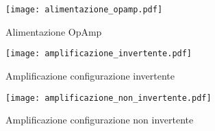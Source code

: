 \begin{figure}[width=0.7\textwidth]
 \centering 
 \texttt{[image: alimentazione\_opamp.pdf]} 
 \caption{Alimentazione OpAmp} 
\end{figure}

\begin{figure}[width=0.7\textwidth]
 \centering 
 \texttt{[image: amplificazione\_invertente.pdf]} 
 \caption{Amplificazione configurazione invertente} 
\end{figure}

\begin{figure}[width=0.7\textwidth]
 \centering 
 \texttt{[image: amplificazione\_non\_invertente.pdf]} 
 \caption{Amplificazione configurazione non invertente} 
\end{figure}
